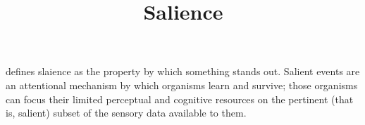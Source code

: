 \documentclass[a4paper]{article}
\title{Salience}
\date{}
\begin{document}
\maketitle
     defines slaience as the property by which something stands out. Salient events are an attentional mechanism by which organisms learn and survive; those organisms can focus their limited perceptual and cognitive resources on the pertinent (that is, salient) subset of the sensory data available to them.
\end{document}
